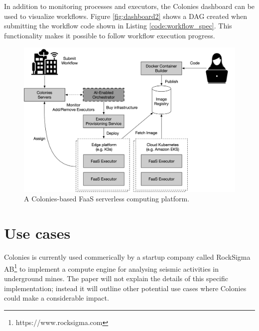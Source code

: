 \documentclass{article}
\begin{document}

In addition to monitoring processes and executors, the Colonies dashboard can be used to visualize workflows. Figure \ref{fig:dashboard2} shows a DAG created when submitting the workflow code shown in Listing \ref{code:workflow_spec}. This functionality makes it possible to follow workflow execution progress.

\begin{figure}[h]
	\centering
    \includegraphics[scale=0.44]{cognite_faas.png}
	\caption{A Colonies-based FaaS serverless computing platform.}
	\label{fig:faas}
\end{figure}

\section{Use cases}
Colonies is currently used commerically by a startup company called RockSigma AB\footnote{https://www.rocksigma.com} to implement a compute engine for analysing seismic activities in underground mines. The paper will not explain the details of this specific implementation; instead it will outline other potential use cases where Colonies could make a considerable impact.
\end{document}
